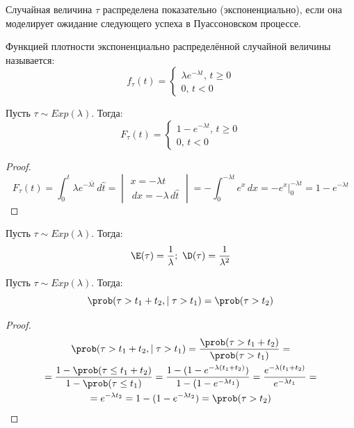 \documentclass[12pt]{article}
\begin{document}
\begin{definition}
    Случайная величина $\tau$ распределена показательно (экспоненциально), если она моделирует ожидание следующего успеха в Пуассоновском процессе.
\end{definition}
\begin{definition}
    Функцией плотности экспоненциально распределённой случайной величины называется:
    $$f_\tau(t)=\begin{cases}
        \lambda e^{-\lambda t},\,t\geq 0\\
        0,\,t<0
    \end{cases}$$
\end{definition}
\begin{statement}
    Пусть $\tau\sim Exp(\lambda)$. Тогда:
    $$F_\tau(t)=\begin{cases}
        1-e^{-\lambda t},\,t\geq 0\\
        0,\,t<0
    \end{cases}$$
\end{statement}
\begin{proof}
    $$F_\tau(t)=\int_{0}^{t}\lambda e^{-\lambda \hat{t}}\,d \hat{t}=\begin{vmatrix}
    x=-\lambda t\\
    \,d x=-\lambda\,d \hat{t}
    \end{vmatrix}=-\int_{0}^{-\lambda t}e^x\,d x=-e^x\Big|_0^{-\lambda t}=1-e^{-\lambda t}$$
\end{proof}
\begin{statement}
    Пусть $\tau\sim Exp(\lambda)$. Тогда:
    $$\E(\tau)=\frac{1}{\lambda};\,\,\D(\tau)=\frac{1}{\lambda^2}$$
\end{statement}
\begin{statement}
    Пусть $\tau\sim Exp(\lambda)$. Тогда:
    $$\prob(\tau>t_1+t_2,\mid \tau>t_1)=\prob(\tau>t_2)$$
\end{statement}
\begin{proof}
    \begin{multline*}
        \prob(\tau>t_1+t_2,\mid \tau>t_1)=\frac{\prob(\tau>t_1+t_2)}{\prob(\tau>t_1)}=\\=\frac{1-\prob(\tau\leq t_1+t_2)}{1-\prob(\tau\leq t_1)}=\frac{1-(1-e^{-\lambda(t_1+t_2)})}{1-(1-e^{-\lambda t_1})}=\frac{e^{-\lambda(t_1+t_2)}}{e^{-\lambda t_1}}=\\=e^{-\lambda t_2}=1-(1-e^{-\lambda t_2})=\prob(\tau>t_2)
    \end{multline*}
\end{proof}
\end{document}
